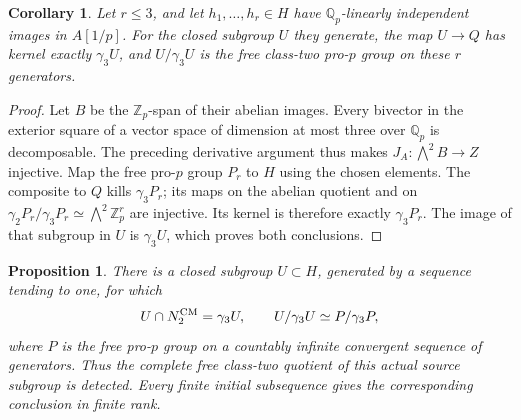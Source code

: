 \documentclass[11pt]{article}
\newtheorem{proposition}[theorem]{Proposition}
\newtheorem{corollary}[theorem]{Corollary}
\theoremstyle{definition}\newtheorem{definition}[theorem]{Definition}
\begin{document}
\begin{corollary}\label{cor:cm-three-generator-class-two}
Let \(r\le3\), and let \(h_1,\ldots,h_r\in H\) have
\(\mathbb Q_p\)-linearly independent images in \(A[1/p]\).
For the closed subgroup \(U\) they generate, the map
\(U\to Q\) has kernel exactly \(\gamma_3U\), and
\(U/\gamma_3U\) is the free class-two pro-\(p\) group
on these \(r\) generators.
\end{corollary}

\begin{proof}
Let \(B\) be the \(\mathbb Z_p\)-span of their abelian
images.  Every bivector in the exterior square of a
vector space of dimension at most three over
\(\mathbb Q_p\) is decomposable.  The preceding
derivative argument thus makes
\(J_A:\bigwedge^2B\to Z\) injective.
Map the free pro-\(p\) group \(P_r\) to \(H\) using
the chosen elements.  The composite to \(Q\) kills
\(\gamma_3P_r\); its maps on the abelian quotient and
on \(\gamma_2P_r/\gamma_3P_r\simeq\bigwedge^2\mathbb Z_p^r\)
are injective.  Its kernel is therefore exactly
\(\gamma_3P_r\).  The image of that subgroup in \(U\)
is \(\gamma_3U\), which proves both conclusions.
\end{proof}

\begin{proposition}\label{prop:cm-countable-class-two}
There is a closed subgroup \(U\subset H\), generated
by a sequence tending to one, for which
\[
 U\cap N_2^{\rm CM}=\gamma_3U,
 \qquad U/\gamma_3U\simeq P/\gamma_3P,
\]
where \(P\) is the free pro-\(p\) group on a countably
infinite convergent sequence of generators.
Thus the complete free class-two quotient of this
actual source subgroup is detected.  Every finite
initial subsequence gives the corresponding conclusion
in finite rank.
\end{proposition}
\end{document}
